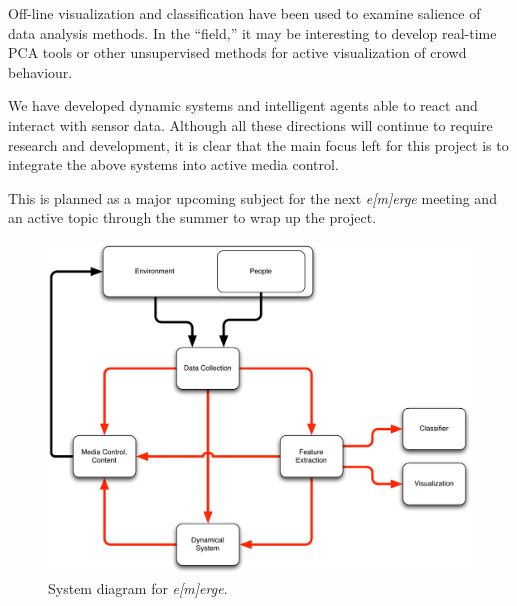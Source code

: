 \documentclass{article}
\newcommand{\emerge}{\emph{e[m]erge}\xspace}
\begin{document}
Off-line visualization and classification have been used to examine
salience of data analysis methods.
In the ``field,'' it may be interesting to develop real-time PCA tools
or other unsupervised methods for active visualization of crowd
behaviour.

We have developed dynamic systems and intelligent agents able to react
and interact with sensor data.
Although all these directions will continue to require research and
development, it is clear that the main focus left for this project is
to integrate the above systems into active media control.

This is planned as a major upcoming subject for the next \emerge
meeting and an active topic through the summer to wrap up the project.

\begin{figure}
\centerline{
  \includegraphics[width=4.5in]{system_diagram.pdf}}
  \caption{System diagram for \emerge.}
\label{fig:system}
\end{figure}



\end{document}
